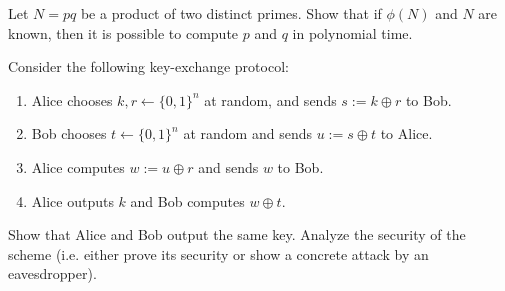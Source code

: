 \documentclass[12pt,letterpaper,boxed]{amspset}
\begin{document}



\begin{problem}[7.6]
Let $N=pq$ be a product of two distinct primes. Show that if $\phi(N)$ and $N$ are known, then it is possible to compute $p$ and $q$ in polynomial time.
\end{problem}

\begin{solution}
\vspace{3cm}

\end{solution}




\begin{problem}[9.1]
Consider the following key-exchange protocol:
\begin{enumerate}
\item Alice chooses $k,r \gets \{0,1\}^n$ at random, and sends $s:=k\oplus r$ to Bob.
\item Bob chooses $t \gets \{0,1\}^n$ at random and sends $u := s\oplus t$ to Alice.
\item Alice computes $w := u\oplus r$ and sends $w$ to Bob.
\item Alice outputs $k$ and Bob computes $w \oplus t$.
\end{enumerate}
Show that Alice and Bob output the same key. Analyze the security of the scheme (i.e. either prove its security or show a concrete attack by an eavesdropper).
\end{problem}

\begin{solution}
\vspace{6cm}

\end{solution}
\end{document}
